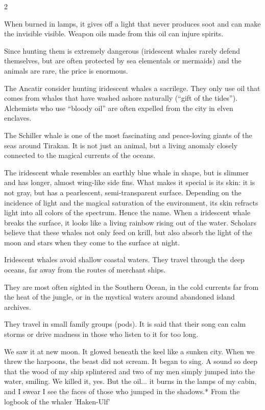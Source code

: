 \begin{multicols}{2}
\begin{denseitemize}
When burned in lamps, it gives off a light that never produces soot and can make the invisible visible. Weapon oils made from this oil can injure spirits.

Since hunting them is extremely dangerous (iridescent whales rarely defend themselves, but are often protected by sea elementals or mermaids) and the animals are rare, the price is enormous.

The Ancatir consider hunting iridescent whales a sacrilege. They only use oil that comes from whales that have washed ashore naturally (“gift of the tides”). Alchemists who use “bloody oil” are often expelled from the city in elven enclaves.

The Schiller whale is one of the most fascinating and peace-loving giants of the seas around Tirakan. It is not just an animal, but a living anomaly closely connected to the magical currents of the oceans.

The iridescent whale resembles an earthly blue whale in shape, but is slimmer and has longer, almost wing-like side fins. What makes it special is its skin: it is not gray, but has a pearlescent, semi-transparent surface.
Depending on the incidence of light and the magical saturation of the environment, its skin refracts light into all colors of the spectrum. Hence the name. When a iridescent whale breaks the surface, it looks like a living rainbow rising out of the water.
Scholars believe that these whales not only feed on krill, but also absorb the light of the moon and stars when they come to the surface at night.

Iridescent whales avoid shallow coastal waters. They travel through the deep oceans, far away from the routes of merchant ships.

They are most often sighted in the Southern Ocean, in the cold currents far from the heat of the jungle, or in the mystical waters around abandoned island archives.

They travel in small family groups (pods). It is said that their song can calm storms or drive madness in those who listen to it for too long. 

We saw it at new moon. It glowed beneath the keel like a sunken city. When we threw the harpoons, the beast did not scream. It began to sing. A sound so deep that the wood of my ship splintered and two of my men simply jumped into the water, smiling. We killed it, yes. But the oil... it burns in the lamps of my cabin, and I swear I see the faces of those who jumped in the shadows.*
From the logbook of the whaler 'Haken-Ulf'
    \end{denseitemize}



\end{multicols}
